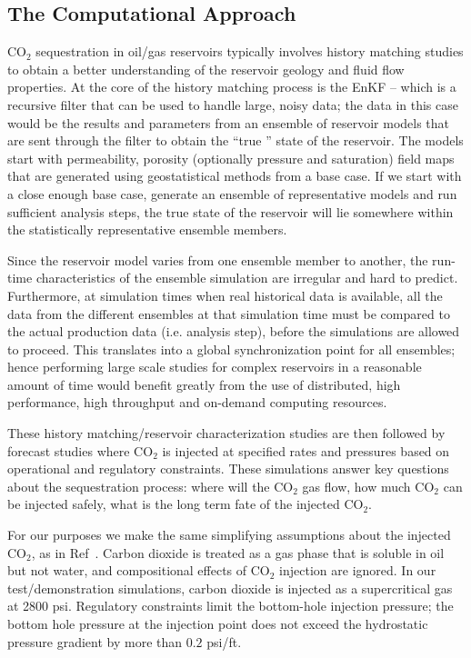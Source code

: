 \documentclass{acm_proc_article-sp}
\begin{document}
\subsection{The Computational Approach}

CO$_2$ sequestration in oil/gas reservoirs typically involves
history matching studies to obtain a better understanding of the
reservoir geology and fluid flow properties.  At the core of the
history matching process is the EnKF -- which is a recursive filter
that can be used to handle large, noisy data; the data in this case
would be the results and parameters from an ensemble of reservoir models
that are sent through the filter to obtain the ``true '' state of the
reservoir. The models start with permeability, porosity (optionally
pressure and saturation) field maps that are generated using
geostatistical methods from a base case. If we start with a
close enough base case, generate an ensemble of representative models
and run sufficient analysis steps, the true state of the reservoir
will lie somewhere within the statistically representative ensemble members.

Since the reservoir model varies from one ensemble member to another, the
run-time characteristics of the ensemble simulation are irregular and
hard to predict. Furthermore, at simulation times when real historical
data is available, all the data from the different ensembles at that
simulation time must be compared to the actual production data (i.e. analysis step), before
the simulations are allowed to proceed. This translates into a global
synchronization point for all ensembles; hence performing large scale
studies for complex reservoirs in a reasonable amount of time would
benefit greatly from the use of distributed, high performance, high
throughput and on-demand computing resources.

These history matching/reservoir characterization studies are then
followed by forecast studies where CO$_2$ is injected at specified
rates and pressures based on operational and regulatory constraints.
These simulations answer key questions about the sequestration
process: where will the CO$_2$ gas flow, how much CO$_2$ can be
injected safely, what is the long term fate of the injected CO$_2$.

For our purposes we make the same simplifying assumptions about the
injected CO$_2$, as in Ref~\cite{Pawar}. Carbon dioxide is treated as
a gas phase that is soluble in oil but not water, and compositional
effects of CO$_2$ injection are ignored. In our test/demonstration
simulations, carbon dioxide is injected as a supercritical gas at 2800
psi. Regulatory constraints limit the bottom-hole injection pressure;
the bottom hole pressure at the injection point does not exceed the
hydrostatic pressure gradient by more than $0.2$ psi/ft.
\end{document}
